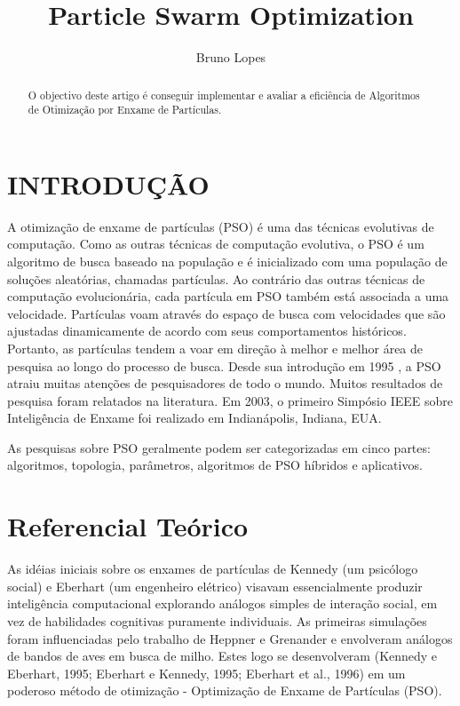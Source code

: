 \documentclass[conference]{IEEEtran}
\begin{document}
\title{Particle Swarm Optimization}

\author{Bruno Lopes}
\maketitle

\begin{abstract}
O objectivo deste artigo é conseguir implementar e avaliar a eficiência de Algoritmos de Otimização por Enxame de Partículas.

\end{abstract}

\vspace*{1cm}
\section{INTRODUÇÃO}
	A otimização de enxame de partículas (PSO) é uma das técnicas evolutivas de computação. Como as outras técnicas de computação evolutiva, o PSO é um algoritmo de busca baseado na população e é inicializado com uma população de soluções aleatórias, chamadas partículas. Ao contrário das outras técnicas de computação evolucionária, cada partícula em PSO também está associada a uma velocidade. Partículas voam através do espaço de busca com velocidades que são ajustadas dinamicamente de acordo com seus comportamentos históricos. Portanto, as partículas tendem a voar em direção à melhor e melhor área de pesquisa ao longo do processo de busca. Desde sua introdução em 1995 \cite{b1}, a PSO atraiu muitas atenções de pesquisadores de todo o mundo. Muitos resultados de pesquisa foram relatados na literatura. Em 2003, o primeiro Simpósio IEEE sobre Inteligência de Enxame foi realizado em Indianápolis, Indiana, EUA. 
		
	As pesquisas sobre PSO geralmente podem ser categorizadas em cinco partes: algoritmos, topologia, parâmetros, algoritmos de PSO híbridos e aplicativos.

\vspace*{1cm}
\section{Referencial Teórico}
	As idéias iniciais sobre os enxames de partículas de Kennedy (um psicólogo social) e Eberhart (um engenheiro elétrico) visavam essencialmente produzir inteligência computacional explorando análogos simples de interação social, em vez de habilidades cognitivas puramente individuais. As primeiras simulações \cite{b1} foram influenciadas pelo trabalho de Heppner e Grenander \cite{b2} e envolveram análogos de bandos de aves em busca de milho. Estes logo se desenvolveram (Kennedy e Eberhart, 1995; Eberhart e Kennedy, 1995; Eberhart et al., 1996) em um poderoso método de otimização - Optimização de Enxame de Partículas (PSO).
\end{document}

